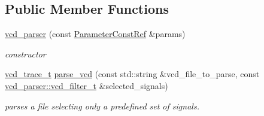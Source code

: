 \subsection*{Public Member Functions}
\begin{DoxyCompactItemize}
\item 
\hyperlink{classvcd__parser_afb44b21eb8fb3e809277f73f4456dc1d}{vcd\+\_\+parser} (const \hyperlink{Parameter_8hpp_a37841774a6fcb479b597fdf8955eb4ea}{Parameter\+Const\+Ref} \&params)
\begin{DoxyCompactList}\small\item\em constructor \end{DoxyCompactList}\item 
\hyperlink{classvcd__parser_a84b85cb9df5165fca362a9da87c5a02f}{vcd\+\_\+trace\+\_\+t} \hyperlink{classvcd__parser_ad8b4e2abd642bf137a99ea67ea139e95}{parse\+\_\+vcd} (const std\+::string \&vcd\+\_\+file\+\_\+to\+\_\+parse, const \hyperlink{classvcd__parser_a00f10dd896fdc534014c6192eed18d55}{vcd\+\_\+parser\+::vcd\+\_\+filter\+\_\+t} \&selected\+\_\+signals)
\begin{DoxyCompactList}\small\item\em parses a file selecting only a predefined set of signals. \end{DoxyCompactList}\end{DoxyCompactItemize}
